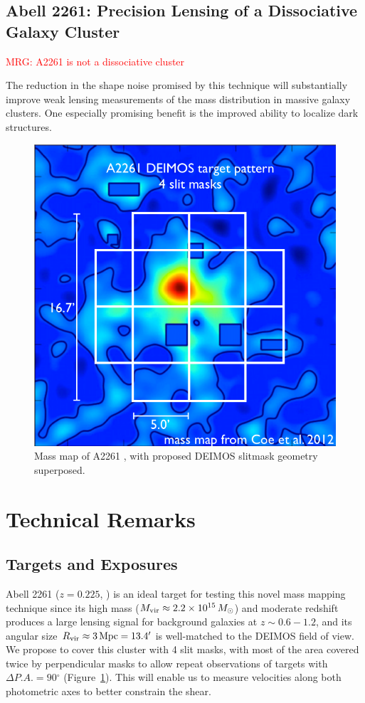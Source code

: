 \documentclass[12pt]{article}
\newcommand{\degr}{\ensuremath{^\circ}}
\begin{document}
\subsection{Abell 2261: Precision Lensing of a Dissociative Galaxy Cluster}
\textcolor{Red}{MRG: A2261 is not a dissociative cluster}

The reduction in the shape noise promised by this technique will substantially improve weak lensing measurements of the mass distribution in massive galaxy clusters. One especially promising benefit is the improved ability to localize dark structures. 

\begin{figure}[t]
\includegraphics[width=0.45\linewidth]{Plots/a2261_deimos_mask.pdf}
\caption{Mass map of A2261 , with proposed DEIMOS slitmask geometry superposed.}
\label{fig:maskoverlay}
\end{figure}



\section{Technical Remarks}

\subsection{Targets and Exposures}

Abell 2261 ($z=0.225$, \citealt{Coe2012}) is an ideal target for testing this novel mass mapping technique since its high mass ($M_{\rm vir}\approx 2.2 \times 10^{15}\,M_{\odot}$) and moderate redshift produces a large lensing signal for background galaxies at $z\sim0.6-1.2$, and its angular size $R_{\rm vir} \approx 3\,{\rm Mpc} = 13.4'$ is well-matched to the DEIMOS field of view. We propose to cover this cluster with 4 slit masks, with most of the area covered twice by perpendicular masks to allow repeat observations of targets with $\Delta P.A.=90\degr$ (Figure~\ref{fig:maskoverlay}). This will enable us to measure velocities along both photometric axes to better constrain the shear.
\end{document}
